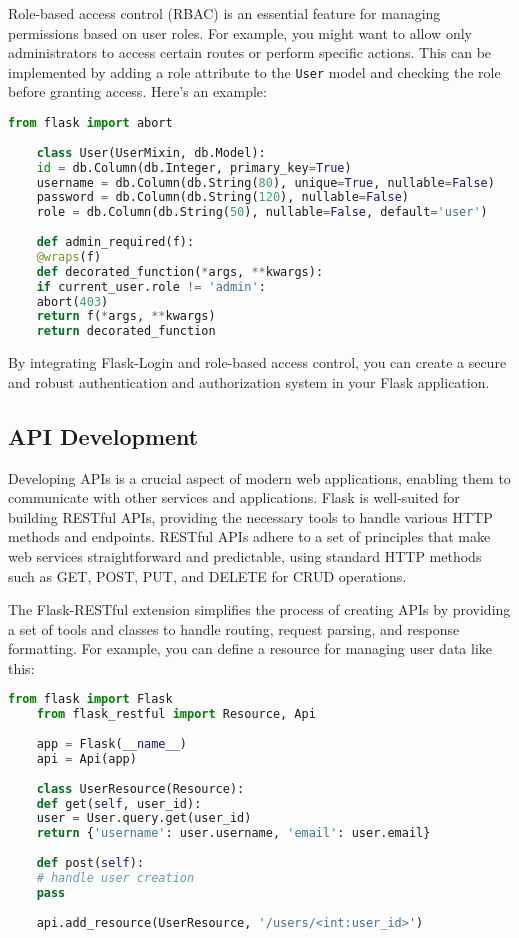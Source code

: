 Role-based access control (RBAC) is an essential feature for managing permissions based on user roles. For example, you might want to allow only administrators to access certain routes or perform specific actions. This can be implemented by adding a role attribute to the \texttt{User} model and checking the role before granting access. Here’s an example:

\begin{lstlisting}[language=Python]
	from flask import abort
	
	class User(UserMixin, db.Model):
	id = db.Column(db.Integer, primary_key=True)
	username = db.Column(db.String(80), unique=True, nullable=False)
	password = db.Column(db.String(120), nullable=False)
	role = db.Column(db.String(50), nullable=False, default='user')
	
	def admin_required(f):
	@wraps(f)
	def decorated_function(*args, **kwargs):
	if current_user.role != 'admin':
	abort(403)
	return f(*args, **kwargs)
	return decorated_function
\end{lstlisting}

By integrating Flask-Login and role-based access control, you can create a secure and robust authentication and authorization system in your Flask application.

\subsection{API Development}

Developing APIs is a crucial aspect of modern web applications, enabling them to communicate with other services and applications. Flask is well-suited for building RESTful APIs, providing the necessary tools to handle various HTTP methods and endpoints. RESTful APIs adhere to a set of principles that make web services straightforward and predictable, using standard HTTP methods such as GET, POST, PUT, and DELETE for CRUD operations.

The Flask-RESTful extension simplifies the process of creating APIs by providing a set of tools and classes to handle routing, request parsing, and response formatting.\cite{sahaflaskrestful:2024} For example, you can define a resource for managing user data like this:

\begin{lstlisting}[language=Python]
	from flask import Flask
	from flask_restful import Resource, Api
	
	app = Flask(__name__)
	api = Api(app)
	
	class UserResource(Resource):
	def get(self, user_id):
	user = User.query.get(user_id)
	return {'username': user.username, 'email': user.email}
	
	def post(self):
	# handle user creation
	pass
	
	api.add_resource(UserResource, '/users/<int:user_id>')
\end{lstlisting}

